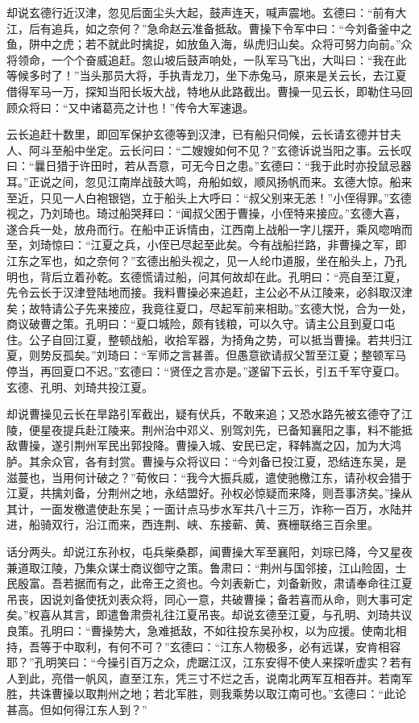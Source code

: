 却说玄德行近汉津，忽见后面尘头大起，鼓声连天，喊声震地。玄德曰：“前有大江，后有追兵，如之奈何？”急命赵云准备抵敌。曹操下令军中曰：“今刘备釜中之鱼，阱中之虎；若不就此时擒捉，如放鱼入海，纵虎归山矣。众将可努力向前。”众将领命，一个个奋威追赶。忽山坡后鼓声响处，一队军马飞出，大叫曰：“我在此等候多时了！”当头那员大将，手执青龙刀，坐下赤兔马，原来是关云长，去江夏借得军马一万，探知当阳长坂大战，特地从此路截出。曹操一见云长，即勒住马回顾众将曰：“又中诸葛亮之计也！”传令大军速退。

云长追赶十数里，即回军保护玄德等到汉津，已有船只伺候，云长请玄德并甘夫人、阿斗至船中坐定。云长问曰：“二嫂嫂如何不见？”玄德诉说当阳之事。云长叹曰：“曩日猎于许田时，若从吾意，可无今日之患。”玄德曰：“我于此时亦投鼠忌器耳。”正说之间，忽见江南岸战鼓大鸣，舟船如蚁，顺风扬帆而来。玄德大惊。船来至近，只见一人白袍银铠，立于船头上大呼曰：“叔父别来无恙！”小侄得罪。”玄德视之，乃刘琦也。琦过船哭拜曰：“闻叔父困于曹操，小侄特来接应。”玄德大喜，遂合兵一处，放舟而行。在船中正诉情由，江西南上战船一字儿摆开，乘风唿哨而至，刘琦惊曰：“江夏之兵，小侄已尽起至此矣。今有战船拦路，非曹操之军，即江东之军也，如之奈何？”玄德出船头视之，见一人纶巾道服，坐在船头上，乃孔明也，背后立着孙乾。玄德慌请过船，问其何故却在此。孔明曰：“亮自至江夏，先令云长于汉津登陆地而接。我料曹操必来追赶，主公必不从江陵来，必斜取汉津矣；故特请公子先来接应，我竟往夏口，尽起军前来相助。”玄德大悦，合为一处，商议破曹之策。孔明曰：“夏口城险，颇有钱粮，可以久守。请主公且到夏口屯住。公子自回江夏，整顿战船，收拾军器，为掎角之势，可以抵当曹操。若共归江夏，则势反孤矣。”刘琦曰：“军师之言甚善。但愚意欲请叔父暂至江夏；整顿军马停当，再回夏口不迟。”玄德曰：“贤侄之言亦是。”遂留下云长，引五千军守夏口。玄德、孔明、刘琦共投江夏。

却说曹操见云长在旱路引军截出，疑有伏兵，不敢来追；又恐水路先被玄德夺了江陵，便星夜提兵赴江陵来。荆州治中邓义、别驾刘先，已备知襄阳之事，料不能抵敌曹操，遂引荆州军民出郭投降。曹操入城、安民已定，释韩嵩之囚，加为大鸿胪。其余众官，各有封赏。曹操与众将议曰：“今刘备已投江夏，恐结连东吴，是滋蔓也，当用何计破之？”荀攸曰：“我今大振兵威，遣使驰檄江东，请孙权会猎于江夏，共擒刘备，分荆州之地，永结盟好。孙权必惊疑而来降，则吾事济矣。”操从其计，一面发檄遣使赴东吴；一面计点马步水军共八十三万，诈称一百万，水陆并进，船骑双行，沿江而来，西连荆、峡、东接蕲、黄、赛栅联络三百余里。

话分两头。却说江东孙权，屯兵柴桑郡，闻曹操大军至襄阳，刘琮已降，今又星夜兼道取江陵，乃集众谋士商议御守之策。鲁肃曰：“荆州与国邻接，江山险固，士民殷富。吾若据而有之，此帝王之资也。今刘表新亡，刘备新败，肃请奉命往江夏吊丧，因说刘备使抚刘表众将，同心一意，共破曹操；备若喜而从命，则大事可定矣。”权喜从其言，即遣鲁肃赍礼往江夏吊丧。却说玄德至江夏，与孔明、刘琦共议良策。孔明曰：“曹操势大，急难抵敌，不如往投东吴孙权，以为应援。使南北相持，吾等于中取利，有何不可？”玄德曰：“江东人物极多，必有远谋，安肯相容耶？”孔明笑曰：“今操引百万之众，虎踞江汉，江东安得不使人来探听虚实？若有人到此，亮借一帆风，直至江东，凭三寸不烂之舌，说南北两军互相吞并。若南军胜，共诛曹操以取荆州之地；若北军胜，则我乘势以取江南可也。”玄德曰：“此论甚高。但如何得江东人到？”

